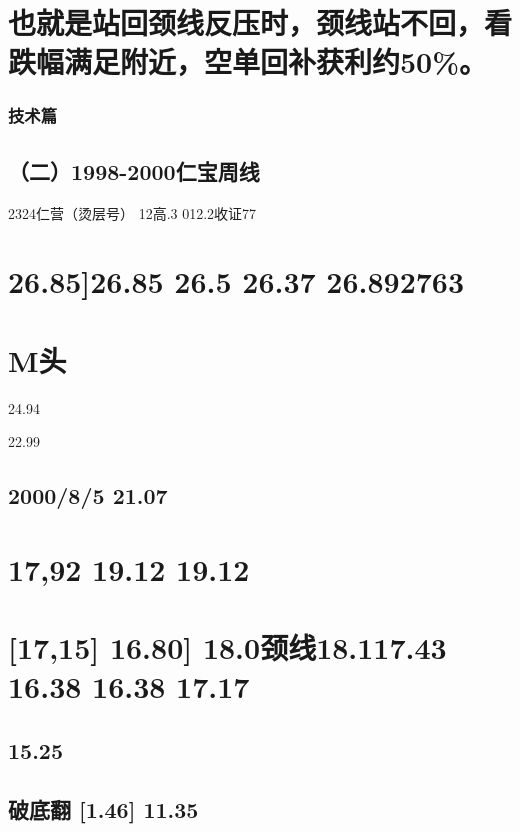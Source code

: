 \documentclass{article}
\begin{document}
\section{也就是站回颈线反压时，颈线站不回，看跌幅满足附近，空单回补获利约50\%。}

\clearpage

\subsubsection{技术篇}

\subsection{（二）1998-2000仁宝周线}

2324仁营（烫层号） 12高.3 012.2收证77

\section{26.85]26.85 26.5 26.37 26.892763}

\section{M头}

24.94

22.99

\subsection{2000/8/5 21.07}

\section{17,92 19.12 19.12}

\section{[17,15] 16.80] 18.0颈线18.117.43 16.38 16.38 17.17}

\subsection{15.25}

\subsection{破底翻 [1.46] 11.35}
\end{document}
